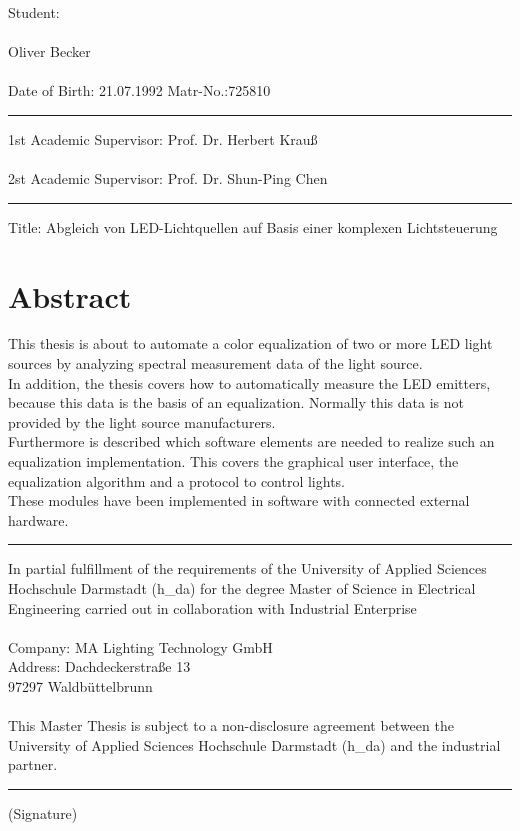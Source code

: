 \documentclass[11pt]{scrartcl}
\begin{document}
\noindent
Student:\\
\\
Oliver \hspace{6cm} Becker\\
\\
Date of Birth: 21.07.1992 \hspace{2.8cm} Matr-No.:725810
\par\noindent\rule{\textwidth}{0.4pt}
1st Academic Supervisor: Prof. Dr. Herbert Krauß\\
\\
2st Academic Supervisor: Prof. Dr. Shun-Ping Chen
\par\noindent\rule{\textwidth}{0.4pt}
Title: Abgleich von LED-Lichtquellen auf Basis einer komplexen Lichtsteuerung\\
\par\vspace{-0.8cm}\section*{Abstract}
This thesis is about to automate a color equalization of two or more LED light sources by analyzing spectral
measurement data of the light source.\\
In addition, the thesis covers how to automatically measure the LED emitters, because this data is the basis of an
equalization. Normally this data is not provided by the light source manufacturers.\\
Furthermore is described which software elements are needed to realize such an equalization implementation.
This covers the graphical user interface, the equalization algorithm and a protocol to control lights.\\
These modules have been implemented in software with connected external hardware.
\vspace{.6cm}
\par\noindent\rule{\textwidth}{0.4pt}
In partial fulfillment of the requirements of the University of Applied Sciences Hochschule
Darmstadt (h\_da) for the degree Master of Science in Electrical Engineering carried out in
collaboration with Industrial Enterprise\\
\\
Company:\hspace{0.45cm} MA Lighting Technology GmbH\\
Address:\hspace{0.7cm} Dachdeckerstraße 13\\
\hspace*{2.15cm} 97297 Waldbüttelbrunn\\
\\
This Master Thesis is subject to a non-disclosure agreement between the University of Applied 
Sciences Hochschule Darmstadt (h\_da) and the industrial partner.\\
\par\noindent\rule{\textwidth}{0.4pt}
(Signature)\\
\end{document}
